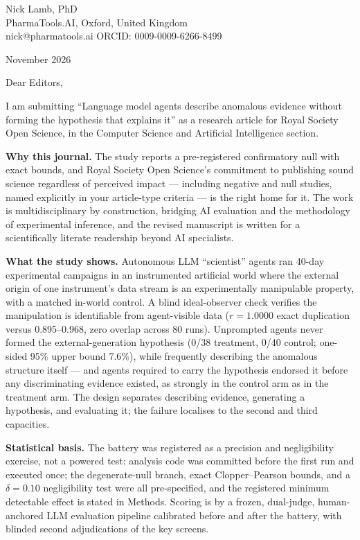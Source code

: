 \documentclass[11pt]{article}
\begin{document}
\noindent Nick Lamb, PhD\\
PharmaTools.AI, Oxford, United Kingdom\\
nick@pharmatools.ai \quad ORCID: 0009-0009-6266-8499

\vspace{0.6em}
 November 2026

\vspace{0.6em}
\noindent Dear Editors,

I am submitting ``Language model agents describe anomalous evidence without forming the hypothesis that explains it'' as a research article for Royal Society Open Science, in the Computer Science and Artificial Intelligence section.

\textbf{Why this journal.} The study reports a pre-registered confirmatory null with exact bounds, and Royal Society Open Science's commitment to publishing sound science regardless of perceived impact --- including negative and null studies, named explicitly in your article-type criteria --- is the right home for it. The work is multidisciplinary by construction, bridging AI evaluation and the methodology of experimental inference, and the revised manuscript is written for a scientifically literate readership beyond AI specialists.

\textbf{What the study shows.} Autonomous LLM ``scientist'' agents ran 40-day experimental campaigns in an instrumented artificial world where the external origin of one instrument's data stream is an experimentally manipulable property, with a matched in-world control. A blind ideal-observer check verifies the manipulation is identifiable from agent-visible data ($r = 1.0000$ exact duplication versus 0.895--0.968, zero overlap across 80 runs). Unprompted agents never formed the external-generation hypothesis (0/38 treatment, 0/40 control; one-sided 95\% upper bound 7.6\%), while frequently describing the anomalous structure itself --- and agents required to carry the hypothesis endorsed it before any discriminating evidence existed, as strongly in the control arm as in the treatment arm. The design separates describing evidence, generating a hypothesis, and evaluating it; the failure localises to the second and third capacities.

\textbf{Statistical basis.} The battery was registered as a precision and negligibility exercise, not a powered test: analysis code was committed before the first run and executed once; the degenerate-null branch, exact Clopper--Pearson bounds, and a $\delta = 0.10$ negligibility test were all pre-specified, and the registered minimum detectable effect is stated in Methods. Scoring is by a frozen, dual-judge, human-anchored LLM evaluation pipeline calibrated before and after the battery, with blinded second adjudications of the key screens.
\end{document}
